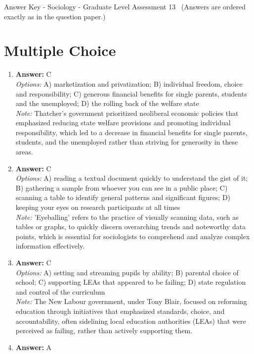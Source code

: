 \documentclass[12pt]{article}
\begin{document}
\begin{center}
Answer Key - Sociology - Graduate Level Assessment 13 \
\small (Answers are ordered exactly as in the question paper.)
\end{center}

\section*{Multiple Choice}
\begin{enumerate}[label=\arabic*.]
\item \textbf{Answer:} C
\\ \textit{Options:} A) marketization and privatization; B) individual freedom, choice and responsibility; C) generous financial benefits for single parents, students and the unemployed; D) the rolling back of the welfare state
\\ \textit{Note:} Thatcher's government prioritized neoliberal economic policies that emphasized reducing state welfare provisions and promoting individual responsibility, which led to a decrease in financial benefits for single parents, students, and the unemployed rather than striving for generosity in these areas.
\item \textbf{Answer:} C
\\ \textit{Options:} A) reading a textual document quickly to understand the gist of it; B) gathering a sample from whoever you can see in a public place; C) scanning a table to identify general patterns and significant figures; D) keeping your eyes on research participants at all times
\\ \textit{Note:} 'Eyeballing' refers to the practice of visually scanning data, such as tables or graphs, to quickly discern overarching trends and noteworthy data points, which is essential for sociologists to comprehend and analyze complex information effectively.
\item \textbf{Answer:} C
\\ \textit{Options:} A) setting and streaming pupils by ability; B) parental choice of school; C) supporting LEAs that appeared to be failing; D) state regulation and control of the curriculum
\\ \textit{Note:} The New Labour government, under Tony Blair, focused on reforming education through initiatives that emphasized standards, choice, and accountability, often sidelining local education authorities (LEAs) that were perceived as failing, rather than actively supporting them.
\item \textbf{Answer:} A

\end{enumerate}
\end{document}
